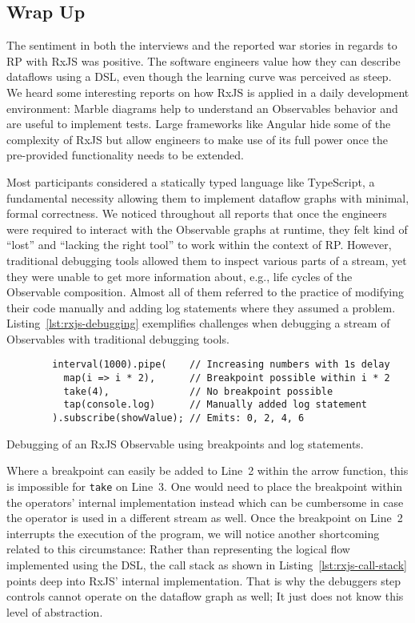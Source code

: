 \documentclass[12pt,a4paper]{article}
\begin{document}
\subsection{Wrap Up}

The sentiment in both the interviews and the reported war stories in regards to RP with RxJS was positive. The software engineers value how they can describe dataflows using a DSL, even though the learning curve was perceived as steep. We heard some interesting reports on how RxJS is applied in a daily development environment: Marble diagrams help to understand  an Observables behavior and are useful to implement tests. Large frameworks like Angular hide some of the complexity of RxJS but allow engineers to make use of its full power once the pre-provided functionality needs to be extended.

Most participants considered a statically typed language like TypeScript, a fundamental necessity allowing them to implement dataflow graphs with minimal, formal correctness. We noticed throughout all reports that once the engineers were required to interact with the Observable graphs at runtime, they felt kind of ``lost'' and ``lacking the right tool'' to work within the context of RP. However, traditional debugging tools allowed them to inspect various parts of a stream, yet they were unable to get more information about, e.g., life cycles of the Observable composition. Almost all of them referred to the practice of modifying their code manually and adding log statements where they assumed a problem. Listing~\ref{lst:rxjs-debugging} exemplifies challenges when debugging a stream of Observables with traditional debugging tools.

\begin{listing}[H]
	\begin{verbatim}
		interval(1000).pipe(    // Increasing numbers with 1s delay
		  map(i => i * 2),      // Breakpoint possible within i * 2
		  take(4),              // No breakpoint possible
		  tap(console.log)      // Manually added log statement
		).subscribe(showValue); // Emits: 0, 2, 4, 6
	\end{verbatim}
	\caption{Debugging of an RxJS Observable using breakpoints and log statements.}
	\label{lst:rxjs-debugging}
\end{listing}

Where a breakpoint can easily be added to Line~2 within the arrow function, this is impossible for \texttt{take} on Line~3. One would need to place the breakpoint within the operators' internal implementation instead which can be cumbersome in case the operator is used in a different stream as well. Once the breakpoint on Line~2 interrupts the execution of the program, we will notice another shortcoming related to this circumstance: Rather than representing the logical flow implemented using the DSL, the call stack as shown in Listing~\ref{lst:rxjs-call-stack} points deep into RxJS' internal implementation. That is why the debuggers step controls cannot operate on the dataflow graph as well; It just does not know this level of abstraction.
\end{document}
